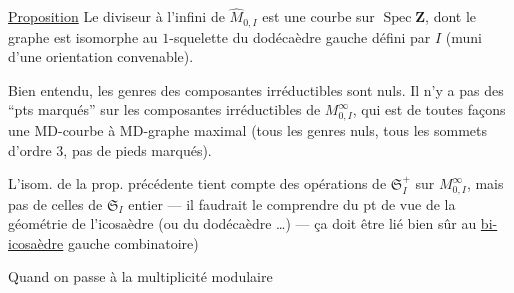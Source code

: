 \uline{Proposition} Le diviseur à l'infini  de $\widehat M_{0,I}$ est une courbe   sur $\operatorname{Spec}\mathbf Z$, dont le graphe est isomorphe au  $1$-squelette du dodécaèdre gauche défini par $I$ (muni d'une orientation convenable).

Bien entendu, les genres des composantes irréductibles sont nuls. Il n'y a pas  des ``pts marqués'' sur  les  composantes irréductibles de $M^\infty_{0,I}$, qui est de toutes façons une MD-courbe  à MD-graphe maximal (tous les genres nuls, tous les sommets d'ordre $3$, pas de pieds marqués).

L'isom. de la prop. précédente tient compte des opérations de $\mathfrak S_I^+$  sur $M^\infty_{0,I}$, mais pas de celles de $\mathfrak S_I$  entier --- il faudrait le comprendre du pt de vue de la géométrie de l'icosaèdre  (ou du dodécaèdre \ldots) --- ça doit être lié bien sûr au \uline{bi-icosaèdre} gauche combinatoire)

Quand on passe à la multiplicité modulaire
